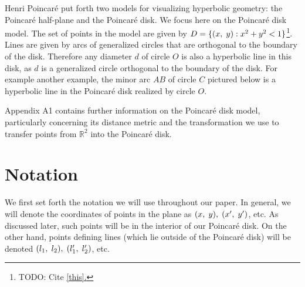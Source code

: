 \documentclass[12pt]{article}
\newcommand{\R}{\mathbb{R}}
\newcommand{\poincare}{Poincar\'{e} }
\newcommand{\ttc}{, \hspace{1mm}}
\theoremstyle{plain}
\theoremstyle{definition}
\begin{document}
	Henri \poincare put forth two models for visualizing hyperbolic geometry: the \poincare half-plane and the \poincare disk. We focus here on the \poincare disk model. The set of points in the model are given by $D = \{(x\ttc y): x^2 + y^2 < 1\}$\footnote{TODO: Cite \href{http://math2.uncc.edu/~frothe/3181alllhyp1_7.pdf}{[this].}}. Lines are given by arcs of generalized circles that are orthogonal to the boundary of the disk. Therefore any diameter $d$ of circle $O$ is also a hyperbolic line in this disk, as $d$ is a generalized circle orthogonal to the boundary of the disk. For example another example, the minor arc $AB$ of circle $C$ pictured below is a hyperbolic line in the \poincare disk realized by circle $O$. 

\begin{center}
\end{center}
	
Appendix A1 contains further information on the \poincare disk model, particularly concerning its distance metric and the transformation we use to transfer points from $\R^2$ into the \poincare disk.





	
\section{Notation}
	
We first set forth the notation we will use throughout our paper. In general, we will denote the coordinates of points in the plane as $(x \ttc y) \ttc (x' \ttc y')$, etc. As discussed later, such points will be in the interior of our \poincare disk. On the other hand, points defining lines (which lie outside of the \poincare disk) will be denoted $(l_1 \ttc l_2) \ttc (l_1' \ttc l_2')$, etc. 
\end{document}
